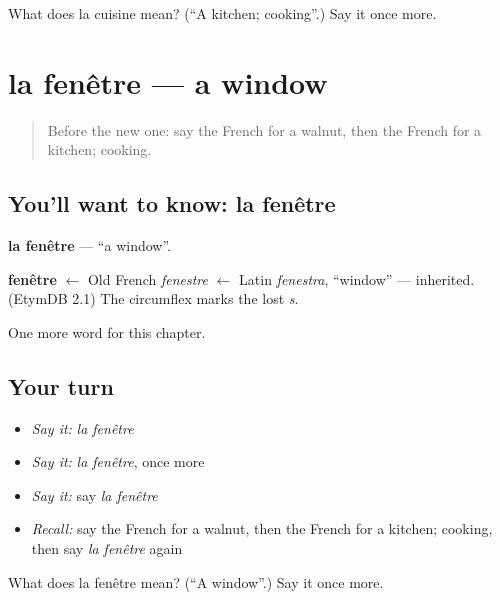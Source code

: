 \begin{tcolorbox}[breakable,colback=teal!4,colframe=teal!35!black,title={Before you move on}]
What does la cuisine mean? (\textquotedblleft{}A kitchen; cooking\textquotedblright{}.) Say it once more.
\end{tcolorbox}
\section[la fenêtre]{la fenêtre — a window}

\label{lesson:FR-C73-fenetre}



\begin{quote}
Before the new one: say the French for a walnut, then the French for a kitchen; cooking.
\end{quote}

\subsection*{You'll want to know: la fenêtre}
\textbf{la fenêtre} — \textquotedblleft{}a window\textquotedblright{}.

\begin{cousinweb}
\textbf{fenêtre} $\leftarrow$ Old French \emph{fenestre} $\leftarrow$ Latin \emph{fenestra}, \textquotedblleft{}window\textquotedblright{} — inherited. (EtymDB 2.1) The circumflex marks the lost \emph{s}.
\end{cousinweb}

\begin{grammarlens}[title={What you've built}]
One more word for this chapter.
\end{grammarlens}

\subsection*{Your turn}
\begin{itemize}
\raggedright
  \item \emph{Say it:} \emph{la fenêtre}
  \item \emph{Say it:} \emph{la fenêtre}, once more
  \item \emph{Say it:} say \emph{la fenêtre}
  \item \emph{Recall:} say the French for a walnut, then the French for a kitchen; cooking, then say \emph{la fenêtre} again
\end{itemize}

\begin{tcolorbox}[breakable,colback=teal!4,colframe=teal!35!black,title={Before you move on}]
What does la fenêtre mean? (\textquotedblleft{}A window\textquotedblright{}.) Say it once more.
\end{tcolorbox}
